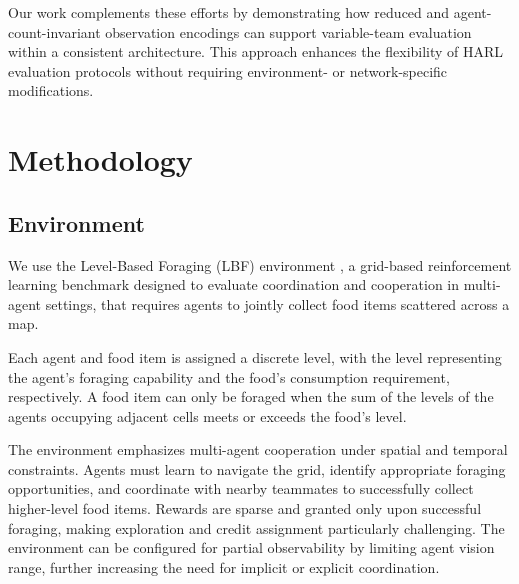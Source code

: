 \documentclass{article}
\begin{document}
        Our work complements these efforts by demonstrating how reduced and agent-count-invariant
        observation encodings can support variable-team evaluation within a consistent architecture.
        This approach enhances the flexibility of HARL evaluation protocols without requiring environment- or
        network-specific modifications.
        
        \section{Methodology}
        
        
        \subsection{Environment}
        
        We use the Level-Based Foraging (LBF) environment \cite{papoudakis2021},
        a grid-based reinforcement learning benchmark designed to evaluate 
        coordination and cooperation in multi-agent settings,
        that requires agents to jointly collect food items scattered across a map. 
        
        Each agent and food item is assigned a discrete level, with the level representing 
        the agent's foraging capability and the food's consumption requirement, respectively.
        A food item can only be foraged when the sum of the levels of the agents 
        occupying adjacent cells meets or exceeds the food's level.
        
        The environment emphasizes multi-agent cooperation under spatial and temporal constraints. 
        Agents must learn to navigate the grid, identify appropriate foraging opportunities, 
        and coordinate with nearby teammates to successfully collect higher-level food items. 
        Rewards are sparse and granted only upon successful foraging, 
        making exploration and credit assignment particularly challenging. 
        The environment can be configured for partial observability by limiting agent vision range, 
        further increasing the need for implicit or explicit coordination.


\printbibliography
\end{document}
